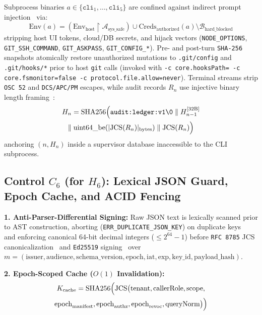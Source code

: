 \documentclass[10pt,twocolumn]{article}
\begin{document}
Subprocess binaries $a \in \{\texttt{cli}_1, \dots, \texttt{cli}_5\}$ are confined against indirect prompt injection~\cite{R22,R25} via:
\begin{equation}
\mathrm{Env}(a) = \left(\mathrm{Env}_{\mathrm{host}} \upharpoonright \mathcal{A}_{\mathrm{sys\_safe}}\right) \cup \mathrm{Creds}_{\mathrm{authorized}}(a) \setminus \mathcal{B}_{\mathrm{hard\_blocked}}
\end{equation}
stripping host UI tokens, cloud/DB secrets, and hijack vectors (\texttt{NODE\_OPTIONS}, \texttt{GIT\_SSH\_COMMAND}, \texttt{GIT\_ASKPASS}, \texttt{GIT\_CONFIG\_*}). Pre- and post-turn \texttt{SHA-256} snapshots atomically restore unauthorized mutations to \texttt{.git/config} and \texttt{.git/hooks/*} prior to host \texttt{git} calls (invoked with \texttt{-c core.hooksPath= -c core.fsmonitor=false -c protocol.file.allow=never}). Terminal streams strip \texttt{OSC 52} and \texttt{DCS/APC/PM} escapes, while audit records $R_n$ use injective binary length framing~\cite{R04}:
\begin{multline}
H_n = \mathrm{SHA256}\Bigl(\texttt{audit:ledger:v1\textbackslash 0} \parallel H_{n-1}^{[32\text{B}]} \\
\parallel \mathrm{uint64\_be}\!\left(\lvert \mathrm{JCS}(R_n) \rvert_{\mathrm{bytes}}\right) \parallel \mathrm{JCS}(R_n)\Bigr)
\end{multline}
anchoring $(n, H_n)$ inside a supervisor database inaccessible to the CLI subprocess.

\subsection{Control $C_6$ (for $H_6$): Lexical JSON Guard, Epoch Cache, and ACID Fencing}

\textbf{1. Anti-Parser-Differential Signing:} Raw JSON text is lexically scanned prior to AST construction, aborting (\texttt{ERR\_DUPLICATE\_JSON\_KEY}) on duplicate keys~\cite{R12,R19} and enforcing canonical 64-bit decimal integers ($\le 2^{64}-1$) before \texttt{RFC 8785} JCS canonicalization~\cite{R17} and \texttt{Ed25519} signing~\cite{R11} over $m = (\mathrm{issuer}, \mathrm{audience}, \mathrm{schema\_version}, \mathrm{epoch}, \mathrm{iat}, \mathrm{exp}, \mathrm{key\_id}, \mathrm{payload\_hash})$.

\textbf{2. Epoch-Scoped Cache ($O(1)$ Invalidation):}
\begin{multline}
K_{\mathrm{cache}} = \mathrm{SHA256}\Bigl(\mathrm{JCS}\bigl(\mathrm{tenant}, \mathrm{callerRole}, \mathrm{scope},\\
\mathrm{epoch}_{\mathrm{manifest}}, \mathrm{epoch}_{\mathrm{authz}}, \mathrm{epoch}_{\mathrm{revoc}}, \mathrm{queryNorm}\bigr)\Bigr)
\end{multline}
\end{document}
